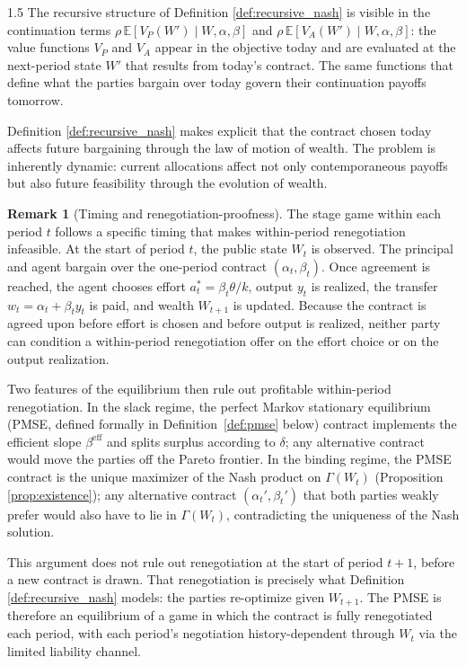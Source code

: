 \documentclass[12pt]{article}
\theoremstyle{definition}
\newtheorem{remark}{Remark}[section]
\theoremstyle{plain}
\begin{document}
\begin{spacing}{1.5}
The recursive structure of Definition \ref{def:recursive_nash} is visible in the continuation terms $\rho\,\mathbb{E}[V_P(W')\mid W,\alpha,\beta]$ and $\rho\,\mathbb{E}[V_A(W')\mid W,\alpha,\beta]$: the value functions $V_P$ and $V_A$ appear in the objective today and are evaluated at the next-period state $W'$ that results from today's contract. The same functions that define what the parties bargain over today govern their continuation payoffs tomorrow.

Definition \ref{def:recursive_nash} makes explicit that the contract chosen today affects future bargaining through the law of motion of wealth. The problem is inherently dynamic: current allocations affect not only contemporaneous payoffs but also future feasibility through the evolution of wealth.

\begin{remark}[Timing and renegotiation-proofness]\label{rem:renegotiation}
The stage game within each period $t$ follows a specific timing that makes within-period renegotiation infeasible. At the start of period $t$, the public state $W_t$ is observed. The principal and agent bargain over the one-period contract $(\alpha_t, \beta_t)$. Once agreement is reached, the agent chooses effort $a_t^* = \beta_t\theta/k$, output $y_t$ is realized, the transfer $w_t = \alpha_t + \beta_t y_t$ is paid, and wealth $W_{t+1}$ is updated. Because the contract is agreed upon before effort is chosen and before output is realized, neither party can condition a within-period renegotiation offer on the effort choice or on the output realization.

Two features of the equilibrium then rule out profitable within-period renegotiation. In the slack regime, the perfect Markov stationary equilibrium (PMSE, defined formally in Definition~\ref{def:pmse} below) contract implements the efficient slope $\beta^{\mathrm{eff}}$ and splits surplus according to $\delta$; any alternative contract would move the parties off the Pareto frontier. In the binding regime, the PMSE contract is the unique maximizer of the Nash product on $\Gamma(W_t)$ (Proposition \ref{prop:existence}); any alternative contract $(\alpha_t', \beta_t')$ that both parties weakly prefer would also have to lie in $\Gamma(W_t)$, contradicting the uniqueness of the Nash solution.

This argument does not rule out renegotiation at the start of period $t+1$, before a new contract is drawn. That renegotiation is precisely what Definition \ref{def:recursive_nash} models: the parties re-optimize given $W_{t+1}$. The PMSE is therefore an equilibrium of a game in which the contract is fully renegotiated each period, with each period's negotiation history-dependent through $W_t$ via the limited liability channel.
\end{remark}



\end{spacing}
\end{document}
